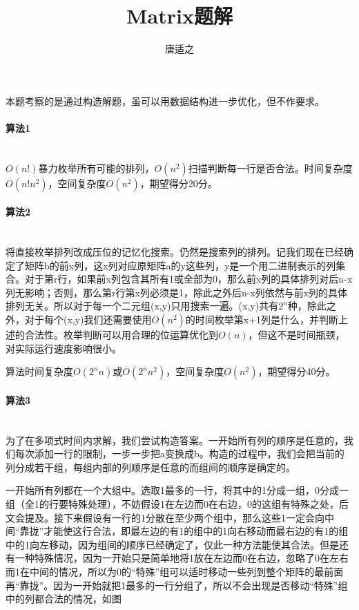 \documentclass[UTF8]{ctexart}
\title{Matrix题解}
\author{唐适之}
\date{}
\newcommand{\myparagraph}[1]{\paragraph{#1}\mbox{}\\}
\begin{document}
	
	\maketitle
	
		本题考察的是通过构造解题，虽可以用数据结构进一步优化，但不作要求。
	
	\myparagraph{算法1}
		
		$O(n!)$暴力枚举所有可能的排列，$O(n^2)$扫描判断每一行是否合法。时间复杂度$O(n!n^2)$，空间复杂度$O(n^2)$，期望得分20分。
		
	\myparagraph{算法2}
	
		将直接枚举排列改成压位的记忆化搜索。仍然是搜索列的排列。记我们现在已经确定了矩阵b的前x列，这x列对应原矩阵a的y这些列，y是一个用二进制表示的列集合。对于第r行，如果前x列包含其所有1或全部为0，那么前x列的具体排列对后n-x列无影响；否则，那么第r行第x列必须是1，除此之外后n-x列依然与前x列的具体排列无关。所以对于每一个二元组(x,y)只用搜索一遍。(x,y)共有$2^n$种，除此之外，对于每个(x,y)我们还需要使用$O(n^2)$的时间枚举第x+1列是什么，并判断上述的合法性。枚举判断可以用合理的位运算优化到$O(n)$，但这不是时间瓶颈，对实际运行速度影响很小。
		
		算法时间复杂度$O(2^n n)$或$O(2^n n^2)$，空间复杂度$O(n^2)$，期望得分40分。
		
	\myparagraph{算法3}
	
		为了在多项式时间内求解，我们尝试构造答案。一开始所有列的顺序是任意的，我们每次添加一行的限制，一步一步把a变换成b。构造的过程中，我们会把当前的列分成若干组，每组内部的列顺序是任意的而组间的顺序是确定的。
		
		一开始所有列都在一个大组中。选取1最多的一行，将其中的1分成一组，0分成一组（全1的行要特殊处理），不妨假设1在左边而0在右边，0的这组有特殊之处，后文会提及。接下来假设有一行的1分散在至少两个组中，那么这些1一定会向中间“靠拢”才能使这行合法，即最左边的有1的组中的1向右移动而最右边的有1的组中的1向左移动，因为组间的顺序已经确定了，仅此一种方法能使其合法。但是还有一种特殊情况，因为一开始只是简单地将1放在左边而0在右边，忽略了0在左右而1在中间的情况，所以为0的“特殊”组可以适时移动一些列到整个矩阵的最前面再“靠拢”。因为一开始就把1最多的一行分组了，所以不会出现是否移动“特殊”组中的列都合法的情况，如图
		
\end{document}
